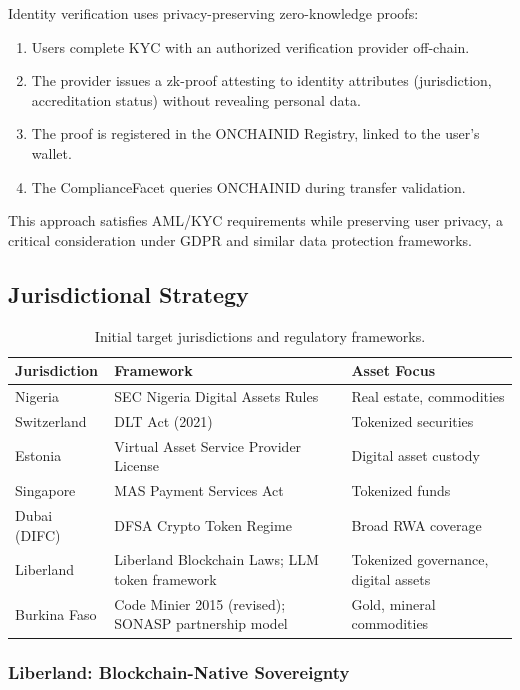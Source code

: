 \documentclass[11pt,a4paper]{article}
\begin{document}
Identity verification uses privacy-preserving zero-knowledge proofs:

\begin{enumerate}[nosep]
    \item Users complete KYC with an authorized verification provider off-chain.
    \item The provider issues a zk-proof attesting to identity attributes (jurisdiction, accreditation status) without revealing personal data.
    \item The proof is registered in the ONCHAINID Registry, linked to the user's wallet.
    \item The ComplianceFacet queries ONCHAINID during transfer validation.
\end{enumerate}

This approach satisfies AML/KYC requirements while preserving user privacy, a critical consideration under GDPR and similar data protection frameworks.

\subsection{Jurisdictional Strategy}

\begin{table}[H]
\centering
\caption{Initial target jurisdictions and regulatory frameworks.}
\begin{tabularx}{\textwidth}{lXX}
\toprule
\textbf{Jurisdiction} & \textbf{Framework} & \textbf{Asset Focus} \\
\midrule
Nigeria & SEC Nigeria Digital Assets Rules & Real estate, commodities \\
Switzerland & DLT Act (2021) & Tokenized securities \\
Estonia & Virtual Asset Service Provider License & Digital asset custody \\
Singapore & MAS Payment Services Act & Tokenized funds \\
Dubai (DIFC) & DFSA Crypto Token Regime & Broad RWA coverage \\
Liberland & Liberland Blockchain Laws; LLM token framework & Tokenized governance, digital assets \\
Burkina Faso & Code Minier 2015 (revised); SONASP partnership model & Gold, mineral commodities \\
\bottomrule
\end{tabularx}
\end{table}

\subsubsection{Liberland: Blockchain-Native Sovereignty}
\end{document}
